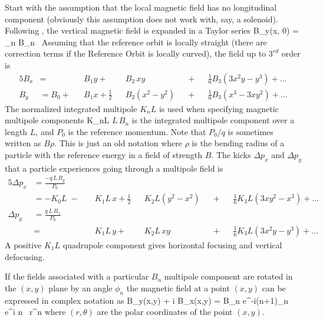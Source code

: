 Start with the assumption that the local magnetic field has no
longitudinal component (obviously this assumption does not work with,
say, a solenoid).  Following \MAD, the vertical magnetic field is
expanded in a Taylor series
\Begineq
  B_y(x, 0) = \sum_n B_n \, 
\Endeq
Assuming that the reference orbit is locally straight 
(there are correction terms if the Reference Orbit is locally curved), the 
field up to $3^{rd}$ order is
\begin{alignat}{5}
  B_x &=           &&B_1 y \plus         &&B_2 \, xy       && \plus && \frac{1}{6} B_3 (3x^2 y - y^3) \plus \ldots \\
  B_y &= B_0 \plus &&B_1 x + \frac{1}{2} &&B_2 (x^2 - y^2) && \plus && \frac{1}{6} B_3 (x^3 - 3x y^2) \plus \ldots
\end{alignat}
The normalized integrated multipole $K_nL$ is used when specifying magnetic
multipole components
\Begineq
  K_nL \equiv {}
\Endeq
$L \, B_n$ is the integrated multipole component over a length $L$,
and $P_0$ is the reference momentum. Note that $P_0/q$ is sometimes
written as $B\rho$. This is just an old notation where $\rho$ is the
bending radius of a particle with the reference energy in a field of
strength $B$. The kicks $\Delta p_x$ and $\Delta p_y$ that a
particle experiences going through a multipole field is
\begin{alignat}{5}
  \Delta p_x & = \frac{-q \, L \, B_y}{P_0} \\
             & = -K_0 L \;-\; 
             && K_1 L \, x \plus 
             \frac{1}{2} && K_2 L (y^2 - x^2) && \plus 
             && \frac{1}{6} K_3 L (3x y^2 - x^3) \plus \ldots \nonumber \\
  \Delta p_y & = \frac{q \, L \, B_x}{P_0} \\
             & =     
             && K_1 L \, y \plus 
             && K_2 L \, xy && \plus 
             && \frac{1}{6} K_3L (3x^2 y - y^3) \plus \ldots \nonumber 
\end{alignat}
A positive $K_1L$ quadrupole component gives
horizontal focusing and vertical defocusing. 

If the fields associated with a particular $B_n$ multipole component
are rotated in the $(x, y)$ plane by an angle $\phi_n$ the magnetic
field at a point $(x,y)$ can be expressed in complex notation as
\Begineq
  B_y(x,y) + i B_x(x,y) = 
                 B_n e^{-i(n+1)\phi_n} \, e^{i n \theta} \, r^n 
\Endeq
where $(r, \theta)$ are the polar coordinates of the point $(x, y)$.

